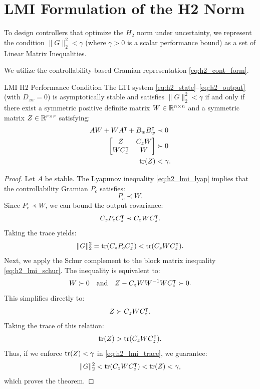 \section{LMI Formulation of the H2 Norm}
To design controllers that optimize the $H_2$ norm under uncertainty, we represent the condition $\| G \|_2^2 < \gamma$ (where $\gamma > 0$ is a scalar performance bound) as a set of Linear Matrix Inequalities.

We utilize the controllability-based Gramian representation \eqref{eq:h2_cont_form}.

\begin{mytheorem}{LMI H2 Performance Condition}
The LTI system \eqref{eq:h2_state}--\eqref{eq:h2_output} (with $D_{zw}=0$) is asymptotically stable and satisfies $\| G \|_2^2 < \gamma$ if and only if there exist a symmetric positive definite matrix $W \in \mathbb{R}^{n \times n}$ and a symmetric matrix $Z \in \mathbb{R}^{r \times r}$ satisfying:
\begin{align}
    A W + W A^\intercal + B_w B_w^\intercal &\prec 0 \label{eq:h2_lmi_lyap} \\
    \begin{bmatrix} Z & C_z W \\ W C_z^\intercal & W \end{bmatrix} &\succ 0 \label{eq:h2_lmi_schur} \\
    \operatorname{tr}(Z) &< \gamma . \label{eq:h2_lmi_trace}
\end{align}
\end{mytheorem}

\begin{proof}
Let $A$ be stable. The Lyapunov inequality \eqref{eq:h2_lmi_lyap} implies that the controllability Gramian $P_c$ satisfies:
\begin{equation}
P_c \prec W .
\end{equation}
Since $P_c \prec W$, we can bound the output covariance:
\begin{equation}
C_z P_c C_z^\intercal \prec C_z W C_z^\intercal .
\end{equation}
Taking the trace yields:
\begin{equation}
\| G \|_2^2 = \operatorname{tr}(C_z P_c C_z^\intercal) < \operatorname{tr}(C_z W C_z^\intercal) .
\end{equation}
Next, we apply the Schur complement to the block matrix inequality \eqref{eq:h2_lmi_schur}. The inequality is equivalent to:
\begin{equation}
W \succ 0 \quad \text{and} \quad Z - C_z W W^{-1} W C_z^\intercal \succ 0 .
\end{equation}
This simplifies directly to:
\begin{equation}
Z \succ C_z W C_z^\intercal .
\end{equation}
Taking the trace of this relation:
\begin{equation}
\operatorname{tr}(Z) > \operatorname{tr}(C_z W C_z^\intercal) .
\end{equation}
Thus, if we enforce $\operatorname{tr}(Z) < \gamma$ in \eqref{eq:h2_lmi_trace}, we guarantee:
\begin{equation}
\| G \|_2^2 < \operatorname{tr}(C_z W C_z^\intercal) < \operatorname{tr}(Z) < \gamma ,
\end{equation}
which proves the theorem.
\end{proof}

